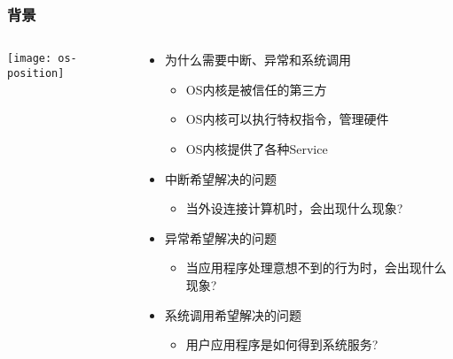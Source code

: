 \begin{frame}[plain]
	\frametitle{背景}
	
	\begin{columns}
		
		\begin{column}{0.4\textwidth}
			\centering
			\texttt{[image: os-position]}
		\end{column}
		
	\begin{column}{0.6\textwidth}
		
    \begin{itemize}
		\item 为什么需要中断、异常和系统调用 \pause
		\begin{itemize}
			\item OS内核是被信任的第三方
			\item OS内核可以执行特权指令，管理硬件
			\item OS内核提供了各种Service
		\end{itemize}   \pause
		\item 中断希望解决的问题
		\begin{itemize}
			\item 当外设连接计算机时，会出现什么现象?
		\end{itemize}  \pause
		\item 异常希望解决的问题
		\begin{itemize}
			\item 当应用程序处理意想不到的行为时，会出现什么现象?
		\end{itemize} \pause
		\item 系统调用希望解决的问题
		\begin{itemize}
			\item 用户应用程序是如何得到系统服务?
		\end{itemize}
	\end{itemize}		
	
	\end{column}
		
	\end{columns}
	
\end{frame}


